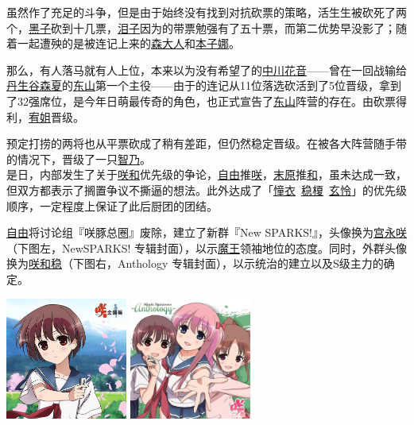 虽然作了充足的斗争，但是由于始终没有找到对抗砍票的策略，活生生被砍死了两个，\uline{黑子}砍到十几票，\uline{泪子}因为的带票勉强有了五十票，而第二优势早没影了；随着一起遭殃的是被连记上来的\uline{森大人}和\uline{本子娜}。

那么，有人落马就有人上位，本来以为没有希望了的\uline{中川花音}——曾在一回战输给\uline{丹生谷森夏}的\uline{东山}第一个主役——由于的连记从11位落选砍活到了5位晋级，拿到了32强席位，是今年日萌最传奇的角色，也正式宣告了\uline{东山}阵营的存在。由砍票得利，\uline{宥姐}晋级。

预定打捞的两将也从平票砍成了稍有差距，但仍然稳定晋级。在被各大阵营随手带的情况下，晋级了一只\uline{智乃}。
\\[1em]

是日，内部发生了关于\uline{咲}\uline{和}优先级的争论，\uline{自由}推\uline{咲}，\uline{末原}推\uline{和}，虽未达成一致，但双方都表示了搁置争议不撕逼的想法。此外达成了「\uline{憧衣}~\uline{稳榎}~\uline{玄怜}」的优先级顺序，一定程度上保证了此后厨团的团结。

\uline{自由}将讨论组『咲豚总圈』废除，建立了新群『New SPARKS!』，头像换为\uline{宫永咲}（下图左，NewSPARKS! 专辑封面），以示\uline{魔王}领袖地位的态度。同时，外群头像换为\uline{咲}\uline{和}\uline{稳}（下图右，Anthology 专辑封面），以示统治的建立以及S级主力的确定。

\begin{center}
\includegraphics[width=0.3\textwidth]{images/NewSPARKS.jpg}
\quad\quad\quad\quad
\includegraphics[width=0.3\textwidth]{images/Anthology.jpg}
\end{center}

